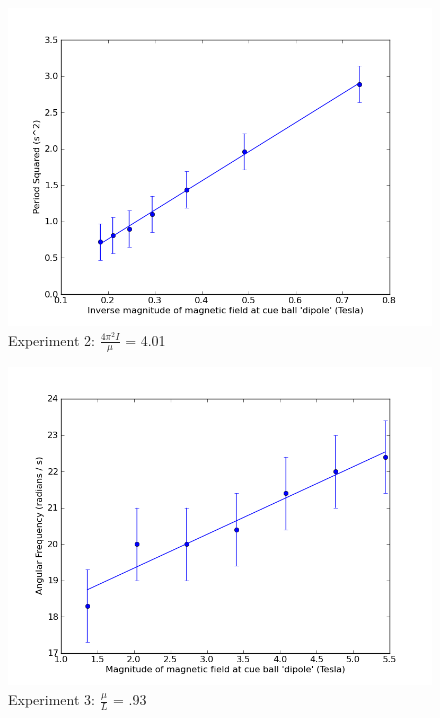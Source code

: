 \documentclass[12pt]{article}
\begin{document}
\begin{figure}[H]
\centering
\hspace{-0.0in}\includegraphics[scale=0.50]{Plot3.png}
\caption{Experiment 2: $\frac{4\pi^2I}{\mu}$ = 4.01 \label{fig:setup}}
\end{figure}

\begin{figure}[H]
\centering
\hspace{-0.0in}\includegraphics[scale=0.50]{Plot4.png}
\caption{Experiment 3: $\frac{\mu}{L}$ = .93 \label{fig:setup}}
\end{figure}
\end{document}
